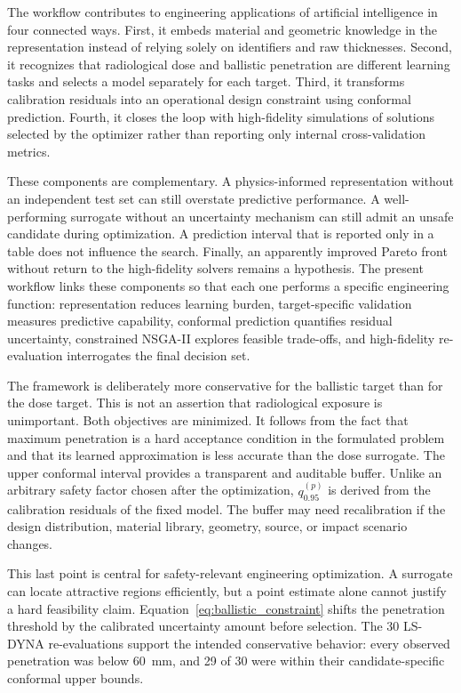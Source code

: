 \documentclass[12pt]{elsarticle}
\newcommand{\SI}[2]{#1~#2}
\begin{document}
	The workflow contributes to engineering applications of artificial intelligence in four connected ways. First, it embeds material and geometric knowledge in the representation instead of relying solely on identifiers and raw thicknesses. Second, it recognizes that radiological dose and ballistic penetration are different learning tasks and selects a model separately for each target. Third, it transforms calibration residuals into an operational design constraint using conformal prediction. Fourth, it closes the loop with high-fidelity simulations of solutions selected by the optimizer rather than reporting only internal cross-validation metrics.
	
	These components are complementary. A physics-informed representation without an independent test set can still overstate predictive performance. A well-performing surrogate without an uncertainty mechanism can still admit an unsafe candidate during optimization. A prediction interval that is reported only in a table does not influence the search. Finally, an apparently improved Pareto front without return to the high-fidelity solvers remains a hypothesis. The present workflow links these components so that each one performs a specific engineering function: representation reduces learning burden, target-specific validation measures predictive capability, conformal prediction quantifies residual uncertainty, constrained NSGA-II explores feasible trade-offs, and high-fidelity re-evaluation interrogates the final decision set.

	
	The framework is deliberately more conservative for the ballistic target than for the dose target. This is not an assertion that radiological exposure is unimportant. Both objectives are minimized. It follows from the fact that maximum penetration is a hard acceptance condition in the formulated problem and that its learned approximation is less accurate than the dose surrogate. The upper conformal interval provides a transparent and auditable buffer. Unlike an arbitrary safety factor chosen after the optimization, $q_{0.95}^{(p)}$ is derived from the calibration residuals of the fixed model. The buffer may need recalibration if the design distribution, material library, geometry, source, or impact scenario changes.
	
	This last point is central for safety-relevant engineering optimization. A surrogate can locate attractive regions efficiently, but a point estimate alone cannot justify a hard feasibility claim. Equation~\eqref{eq:ballistic_constraint} shifts the penetration threshold by the calibrated uncertainty amount before selection. The 30 LS-DYNA re-evaluations support the intended conservative behavior: every observed penetration was below \SI{60}{mm}, and 29 of 30 were within their candidate-specific conformal upper bounds.
	
\end{document}
